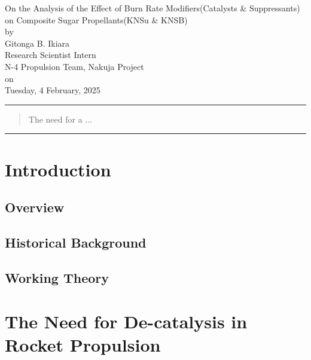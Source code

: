 \documentclass[12pt,letterpaper]{article}
\begin{document}
    \begin{center}
        \huge{On the Analysis of the Effect of Burn Rate Modifiers(Catalysts \&
	Suppressants) on Composite Sugar Propellants(KNSu \& KNSB)}             \\
       	\normalsize{by}        						        \\
        \Large{Gitonga B. Ikiara}	          				\\
        \large{Research Scientist Intern}					\\
        \large{N-4 Propulsion Team, Nakuja Project} 				\\
        \normalsize{on} 							\\
        \large{Tuesday, 4 February, 2025}
    \end{center}

    \rule{\textwidth}{0.5pt}
    \begin{abstract}
        \noindent The need for a ...
    \end{abstract}
    \rule{\textwidth}{0.5pt}

    \section{Introduction}
        \subsection{Overview}
                \lipsum[1-2]
            \subsection{Historical Background}
                    \lipsum[1-3]
        \subsection{Working Theory}
            \lipsum[1-2]\cite{nakka2007simplified}

    \section{The Need for De-catalysis in Rocket Propulsion}
\end{document}
